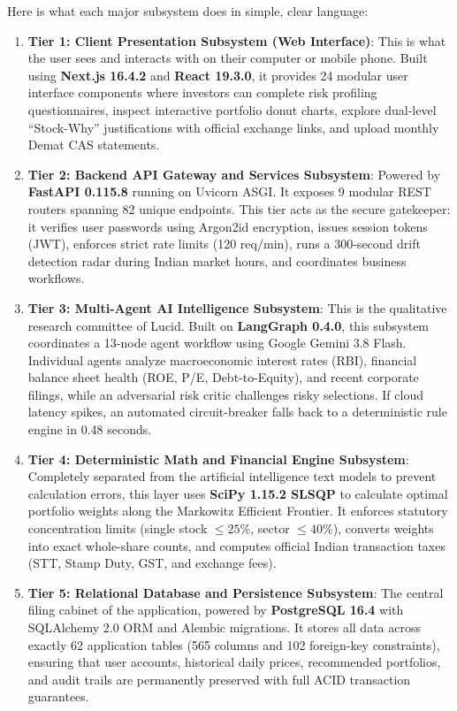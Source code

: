 Here is what each major subsystem does in simple, clear language:
\begin{enumerate}
    \item \textbf{Tier 1: Client Presentation Subsystem (Web Interface)}: This is what the user sees and interacts with on their computer or mobile phone. Built using \textbf{Next.js 16.4.2} and \textbf{React 19.3.0}, it provides 24 modular user interface components where investors can complete risk profiling questionnaires, inspect interactive portfolio donut charts, explore dual-level ``Stock-Why'' justifications with official exchange links, and upload monthly Demat CAS statements.
    \item \textbf{Tier 2: Backend API Gateway and Services Subsystem}: Powered by \textbf{FastAPI 0.115.8} running on Uvicorn ASGI. It exposes 9 modular REST routers spanning 82 unique endpoints. This tier acts as the secure gatekeeper: it verifies user passwords using Argon2id encryption, issues session tokens (JWT), enforces strict rate limits (120 req/min), runs a 300-second drift detection radar during Indian market hours, and coordinates business workflows.
    \item \textbf{Tier 3: Multi-Agent AI Intelligence Subsystem}: This is the qualitative research committee of Lucid. Built on \textbf{LangGraph 0.4.0}, this subsystem coordinates a 13-node agent workflow using Google Gemini 3.8 Flash. Individual agents analyze macroeconomic interest rates (RBI), financial balance sheet health (ROE, P/E, Debt-to-Equity), and recent corporate filings, while an adversarial risk critic challenges risky selections. If cloud latency spikes, an automated circuit-breaker falls back to a deterministic rule engine in 0.48 seconds.
    \item \textbf{Tier 4: Deterministic Math and Financial Engine Subsystem}: Completely separated from the artificial intelligence text models to prevent calculation errors, this layer uses \textbf{SciPy 1.15.2 SLSQP} to calculate optimal portfolio weights along the Markowitz Efficient Frontier. It enforces statutory concentration limits (single stock $\le 25\%$, sector $\le 40\%$), converts weights into exact whole-share counts, and computes official Indian transaction taxes (STT, Stamp Duty, GST, and exchange fees).
    \item \textbf{Tier 5: Relational Database and Persistence Subsystem}: The central filing cabinet of the application, powered by \textbf{PostgreSQL 16.4} with SQLAlchemy 2.0 ORM and Alembic migrations. It stores all data across exactly 62 application tables (565 columns and 102 foreign-key constraints), ensuring that user accounts, historical daily prices, recommended portfolios, and audit trails are permanently preserved with full ACID transaction guarantees.

\end{enumerate}
